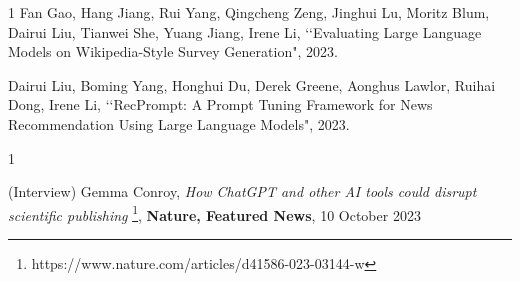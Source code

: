 \begin{発表}{1}
Fan Gao, Hang Jiang, Rui Yang, Qingcheng Zeng, Jinghui Lu, Moritz Blum, Dairui Liu, Tianwei She, Yuang Jiang, Irene Li, \lq\lq Evaluating Large Language Models on Wikipedia-Style Survey Generation", 2023.

Dairui Liu, Boming Yang, Honghui Du, Derek Greene, Aonghus Lawlor, Ruihai Dong, Irene Li, \lq\lq RecPrompt: A Prompt Tuning Framework for News Recommendation Using Large Language Models", 2023.


\end{発表}



\begin{報道}{1}


(Interview) Gemma Conroy, \textit{How ChatGPT and other AI tools could disrupt scientific publishing} \footnote{https://www.nature.com/articles/d41586-023-03144-w}, \textbf{Nature, Featured News}, 10 October 2023 

\end{報道}

